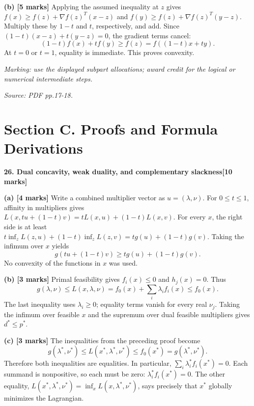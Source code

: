 \documentclass[11pt,a4paper]{article}
\begin{document}
\textbf{(b) [5 marks]} Applying the assumed inequality at \(z\) gives \(f(x)\ge f(z)+\nabla f(z)^T(x-z)\) and \(f(y)\ge f(z)+\nabla f(z)^T(y-z)\). Multiply these by \(1-t\) and \(t\), respectively, and add. Since \((1-t)(x-z)+t(y-z)=0\), the gradient terms cancel: \[(1-t)f(x)+tf(y)\ge f(z)=f((1-t)x+ty).\] At \(t=0\) or \(t=1\), equality is immediate. This proves convexity.

\textit{Marking: use the displayed subpart allocations; award credit for the logical or numerical intermediate steps.}\par
{\footnotesize\textit{Source: PDF pp.17-18.}}
\newpage\section*{Section C. Proofs and Formula Derivations}
\textbf{26. Dual concavity, weak duality, and complementary slackness}\hfill\textbf{[10 marks]}\par\medskip
\textbf{(a) [4 marks]} Write a combined multiplier vector as \(u=(\lambda,\nu)\). For \(0\le t\le1\), affinity in multipliers gives \(L(x,tu+(1-t)v)=tL(x,u)+(1-t)L(x,v)\). For every \(x\), the right side is at least \(t\inf_zL(z,u)+(1-t)\inf_zL(z,v)=tg(u)+(1-t)g(v)\). Taking the infimum over \(x\) yields \[g(tu+(1-t)v)\ge tg(u)+(1-t)g(v).\] No convexity of the functions in \(x\) was used.

\textbf{(b) [3 marks]} Primal feasibility gives \(f_i(x)\le0\) and \(h_j(x)=0\). Thus \[g(\lambda,\nu)\le L(x,\lambda,\nu)=f_0(x)+\sum_i\lambda_if_i(x)\le f_0(x).\] The last inequality uses \(\lambda_i\ge0\); equality terms vanish for every real \(\nu_j\). Taking the infimum over feasible \(x\) and the supremum over dual feasible multipliers gives \(d^*\le p^*\).

\textbf{(c) [3 marks]} The inequalities from the preceding proof become \[g(\lambda^*,\nu^*)\le L(x^*,\lambda^*,\nu^*)\le f_0(x^*)=g(\lambda^*,\nu^*).\] Therefore both inequalities are equalities. In particular, \(\sum_i\lambda_i^*f_i(x^*)=0\). Each summand is nonpositive, so each must be zero: \(\lambda_i^*f_i(x^*)=0\). The other equality, \(L(x^*,\lambda^*,\nu^*)=\inf_xL(x,\lambda^*,\nu^*)\), says precisely that \(x^*\) globally minimizes the Lagrangian.
\end{document}

